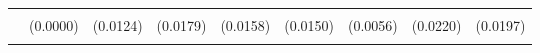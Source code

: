 \begin{table}[!h]
\begin{tabular}[t]{lllllllll}
\addlinespace
\cellcolor{gray!10}{WSLS} & \cellcolor{gray!10}{0.0000} & \cellcolor{gray!10}{0.0090} & \cellcolor{gray!10}{0.0475**} & \cellcolor{gray!10}{0.0327*} & \cellcolor{gray!10}{0.0305*} & \cellcolor{gray!10}{0.0010} & \cellcolor{gray!10}{0.0340} & \cellcolor{gray!10}{0.0308}\\
 & (0.0000) & (0.0124) & (0.0179) & (0.0158) & (0.0150) & (0.0056) & (0.0220) & (0.0197)\\
\cellcolor{gray!10}{T2} & \cellcolor{gray!10}{0.1435} & \cellcolor{gray!10}{0.1822**} & \cellcolor{gray!10}{0.0001} & \cellcolor{gray!10}{0.0316} & \cellcolor{gray!10}{0.0166} & \cellcolor{gray!10}{0.0721*} & \cellcolor{gray!10}{0.1046} & \cellcolor{gray!10}{0.0503}\\
\bottomrule
\end{tabular}
\end{table}